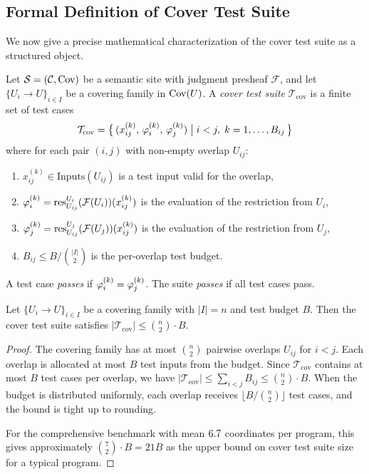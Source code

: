 \documentclass[11pt]{article}
\newcommand{\CoverSuite}{\mathcal{T}_{\mathrm{cov}}}
\begin{document}
\subsection{Formal Definition of Cover Test Suite}\label{sec:cover-suite-def}

We now give a precise mathematical characterization of the cover test suite
as a structured object.

\begin{definition}\label{def:cover-suite}
Let $\mathcal{S} = (\mathcal{C}, \mathrm{Cov})$ be a semantic site with judgment presheaf
$\mathcal{F}$, and let $\{U_i \to U\}_{i \in I}$ be a covering family in
$\mathrm{Cov}(U)$.  A \emph{cover test suite} $\CoverSuite$ is a finite set of
test cases
\[
  \CoverSuite = \bigl\{\, (x_{ij}^{(k)},\, \prop_i^{(k)},\, \prop_j^{(k)})
  \;\big|\; i < j,\; k = 1, \ldots, B_{ij} \,\bigr\}
\]
where for each pair $(i,j)$ with non-empty overlap $U_{ij}$:
\begin{enumerate}[noitemsep]
  \item $x_{ij}^{(k)} \in \mathrm{Inputs}(U_{ij})$ is a test input valid
        for the overlap,
  \item $\varphi_i^{(k)} = \mathrm{res}_{U_{ij}}^{U_i}(\mathcal{F}(U_i))(x_{ij}^{(k)})$
        is the evaluation of the restriction from $U_i$,
  \item $\varphi_j^{(k)} = \mathrm{res}_{U_{ij}}^{U_j}(\mathcal{F}(U_j))(x_{ij}^{(k)})$
        is the evaluation of the restriction from $U_j$,
  \item $B_{ij} \leq B / \binom{|I|}{2}$ is the per-overlap test budget.
\end{enumerate}
A test case \emph{passes} if $\varphi_i^{(k)} = \varphi_j^{(k)}$.  The suite
\emph{passes} if all test cases pass.
\end{definition}

\begin{theorem}\label{thm:cover-bound}
Let $\{U_i \to U\}_{i \in I}$ be a covering family with $|I| = n$ and
test budget $B$.  Then the cover test suite satisfies
$|\CoverSuite| \leq \binom{n}{2} \cdot B$.
\end{theorem}

\begin{proof}
The covering family has at most $\binom{n}{2}$ pairwise overlaps
$U_{ij}$ for $i < j$.  Each overlap is allocated at most $B$ test inputs
from the budget.  Since $\CoverSuite$ contains at most $B$ test cases
per overlap, we have
$|\CoverSuite| \leq \sum_{i<j} B_{ij} \leq \binom{n}{2} \cdot B$.
When the budget is distributed uniformly, each overlap receives
$\lfloor B / \binom{n}{2} \rfloor$ test cases, and the bound is tight
up to rounding.

For the comprehensive benchmark with mean $6.7$ coordinates
per program, this gives approximately $\binom{7}{2} \cdot B = 21B$ as
the upper bound on cover test suite size for a typical program.
\end{proof}
\end{document}
